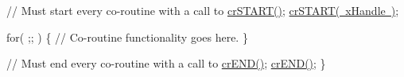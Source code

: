 \begin{DoxyPre}    // Must start every co-routine with a call to \mbox{\hyperlink{croutine_8h_a19a57a201a325e8af1207ed68c4aedde}{crSTART()}};
    \mbox{\hyperlink{croutine_8h_a19a57a201a325e8af1207ed68c4aedde}{crSTART( xHandle )}};\end{DoxyPre}



\begin{DoxyPre}    for( ;; )
    \{
         // Co-routine functionality goes here.
    \}\end{DoxyPre}



\begin{DoxyPre}    // Must end every co-routine with a call to \mbox{\hyperlink{croutine_8h_ae6038cc976689b50000475ebfc4e2f23}{crEND()}};
    \mbox{\hyperlink{croutine_8h_ae6038cc976689b50000475ebfc4e2f23}{crEND()}};
\}\end{DoxyPre}
 